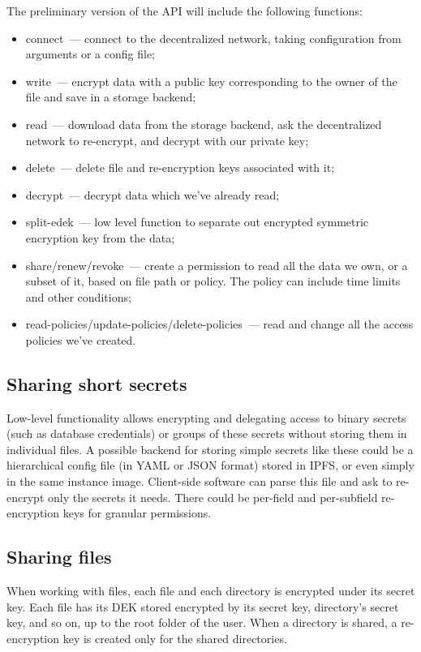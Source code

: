 \documentclass[notitlepage,longbibliography]{revtex4-1}
\begin{document}
The preliminary version of the API will include the following functions:
\begin{itemize}
    \item connect~--- connect to the decentralized network,
        taking configuration from arguments or a config file;
    \item write~--- encrypt data with a public key corresponding to the owner of the file and save in a storage backend;
    \item read~--- download data from the storage backend, ask the decentralized network to re-encrypt, and decrypt with our private key;
    \item delete~--- delete file and re-encryption keys associated with it;
    \item decrypt~--- decrypt data which we've already read;
    \item split-edek~--- low level function to separate out encrypted symmetric encryption key from the data;
    \item share/renew/revoke~--- create a permission to read all the data we own, or a subset of it, based on file path or policy.
        The policy can include time limits and other conditions;
    \item read-policies/update-policies/delete-policies~--- read and change all the access policies we've created.
\end{itemize}

\subsection{Sharing short secrets}

Low-level functionality allows encrypting and delegating access to binary secrets (such as database credentials) or groups of these secrets without
storing them in individual files.
A possible backend for storing simple secrets like these could be a hierarchical config file (in YAML or JSON format) stored in IPFS,
or even simply in the same instance image.
Client-side software can parse this file and ask to re-encrypt only the secrets it needs.
There could be per-field and per-subfield re-encryption keys for granular permissions.

\subsection{Sharing files}

When working with files, each file and each directory is encrypted under its secret key.
Each file has its DEK stored encrypted by its secret key, directory's secret key, and so on, up to the root folder of the user.
When a directory is shared, a re-encryption key is created only for the shared directories.
\end{document}
